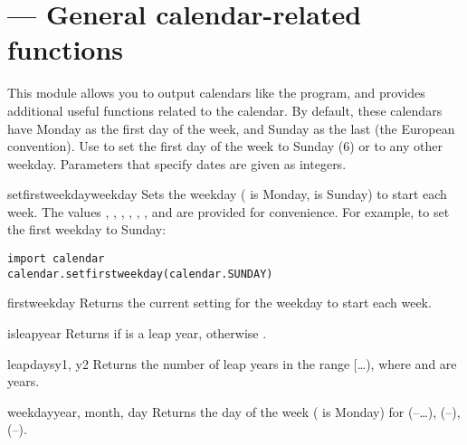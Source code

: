 \section{ ---
         General calendar-related functions}


This module allows you to output calendars like the \UNIX{}
 program, and provides additional useful functions
related to the calendar. By default, these calendars have Monday as
the first day of the week, and Sunday as the last (the European
convention). Use  to set the first day of the
week to Sunday (6) or to any other weekday.  Parameters that specify
dates are given as integers.

\begin{funcdesc}{setfirstweekday}{weekday}
Sets the weekday ( is Monday,  is Sunday) to start
each week. The values , ,
, , ,
, and  are provided for
convenience. For example, to set the first weekday to Sunday:

\begin{verbatim}
import calendar
calendar.setfirstweekday(calendar.SUNDAY)
\end{verbatim}
\end{funcdesc}

\begin{funcdesc}{firstweekday}{}
Returns the current setting for the weekday to start each week.
\end{funcdesc}

\begin{funcdesc}{isleap}{year}
Returns  if  is a leap year, otherwise .
\end{funcdesc}

\begin{funcdesc}{leapdays}{y1, y2}
Returns the number of leap years in the range
[\ldots{}), where  and  are years.
\end{funcdesc}

\begin{funcdesc}{weekday}{year, month, day}
Returns the day of the week ( is Monday) for 
(--\ldots),  (--), 
(--).
\end{funcdesc}

